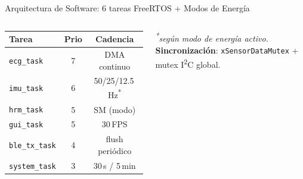 \documentclass[aspectratio=169, 10pt]{beamer}
\begin{document}
\begin{frame}{Arquitectura de Software: 6 tareas FreeRTOS + Modos de Energ\'ia}
    \begin{columns}[T]
        \scriptsize
        \begin{tabular}{l c c}
            \toprule
            \textbf{Tarea} & \textbf{Prio} & \textbf{Cadencia} \\
            \midrule
            \texttt{ecg\_task}     & 7 & DMA continuo \\
            \texttt{imu\_task}     & 6 & 50/25/12.5\,Hz\textsuperscript{*}\\
            \texttt{hrm\_task}     & 5 & SM (modo) \\
            \texttt{gui\_task}     & 5 & 30\,FPS \\
            \texttt{ble\_tx\_task} & 4 & flush peri\'odico \\
            \texttt{system\_task}  & 3 & 30\,s / 5\,min \\
            \bottomrule
        \end{tabular}
        \vspace{0.15cm}
        \scriptsize\textit{\textsuperscript{*}seg\'un modo de energ\'ia activo.}
        \vspace{0.3cm}
        \textbf{Sincronizaci\'on}: \texttt{xSensorDataMutex} + mutex I\textsuperscript{2}C global.


\end{columns}
\end{frame}
\end{document}
